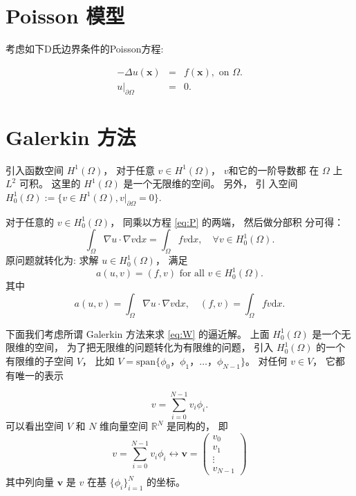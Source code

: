 \documentclass{article}
\begin{document}
\section{Poisson 模型}
考虑如下D氏边界条件的Poisson方程:

\begin{eqnarray}
    -\Delta u(\mathbf x) &=& f(\mathbf x),\text{ on } \Omega.\label{eq:P}\\
    u|_{\partial\Omega} &=& 0.
\end{eqnarray}

\section{Galerkin 方法}

引入函数空间 $H^1(\Omega)$， 对于任意 $v \in H^1(\Omega)$， $v$和它的一阶导数都
在 $\Omega$ 上 $L^2$ 可积。 这里的 $H^1(\Omega)$ 是一个无限维的空间。 另外， 引
入空间 $H^1_0(\Omega) := \{v\in H^1(\Omega), v|_{\partial\Omega} = 0\}$.

对于任意的 $v\in H^1_0(\Omega)$， 同乘以方程 \eqref{eq:P} 的两端， 然后做分部积
分可得：
\begin{equation}\label{eq:wg}
    \int_{\Omega}\nabla u\cdot\nabla v\mathrm{d}x = \int_{\Omega}fv\mathrm{d}x,
    \quad\forall v \in H^1_0(\Omega).
\end{equation}
原问题就转化为: 求解 $u\in H_0^1(\Omega)$， 满足
\begin{equation}\label{eq:W}
    a(u, v) = (f,v) \text{ for all }v\in H_0^1(\Omega).
\end{equation}
其中
$$
a(u, v) = \int_{\Omega}\nabla u\cdot\nabla v\mathrm{d}x,
\quad (f,v) =  \int_{\Omega}fv\mathrm{d}x.
$$

下面我们考虑所谓 Galerkin 方法来求 \eqref{eq:W} 的逼近解。 上面 $H_0^1(\Omega)$
是一个无限维的空间， 为了把无限维的问题转化为有限维的问题， 引入 $H_0^1(\Omega)$
的一个有限维的子空间 $V$， 比如 $V=\mathrm{span}\{\phi_0，\phi_1，\ldots，
\phi_{N-1}\}$。 对任何 $v \in V$， 它都有唯一的表示

$$
v = \sum\limits_{i=0}^{N-1} v_i\phi_i.
$$
可以看出空间 $V$ 和 $N$ 维向量空间 $\mathbb{R}^N$ 是同构的， 即
$$
v = \sum\limits_{i=0}^{N-1} v_i\phi_i\leftrightarrow\mathbf{v} =
\begin{pmatrix}
    v_0 \\ v_1 \\ \vdots \\ v_{N-1}
\end{pmatrix}
$$
其中列向量 $\mathbf{v}$ 是 $v$ 在基 $\{\phi_i\}_{i=1}^N$ 的坐标。 
\end{document}
